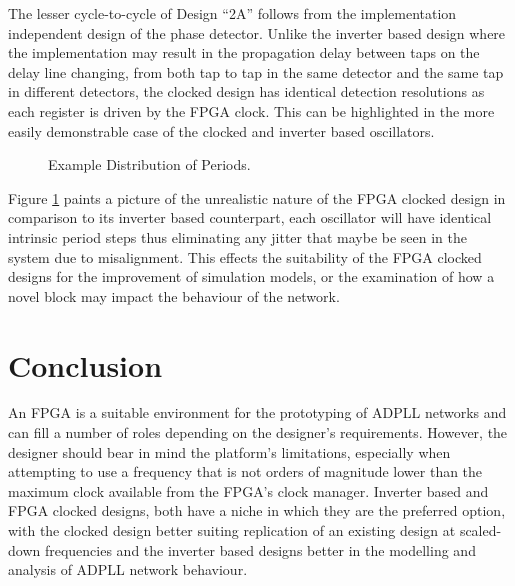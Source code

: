 \documentclass[conference]{IEEEtran}
\begin{document}
The lesser cycle-to-cycle of Design ``2A'' follows from the implementation independent design of the phase detector. Unlike the inverter based design where the implementation may result in the propagation delay between taps on the delay line changing, from both tap to tap in the same detector and the same tap in different detectors, the clocked design has identical detection resolutions as each register is driven by the FPGA clock. This can be highlighted in the more easily demonstrable case of the clocked and inverter based oscillators.\\
\begin{figure}[h]%
    \centering
    \caption{Example Distribution of Periods.\label{fig:dists}}    
    \vspace{-0.5cm}
\end{figure}
Figure \ref{fig:dists} paints a picture of the unrealistic nature of the FPGA clocked design in comparison to its inverter based counterpart, each oscillator will have identical intrinsic period steps thus eliminating any jitter that maybe be seen in the system due to misalignment. This effects the suitability of the FPGA clocked designs for the improvement of simulation models, or the examination of how a novel block may impact the behaviour of the network.
\section*{Conclusion}
An FPGA is a suitable environment for the prototyping of ADPLL networks and can fill a number of roles depending on the designer's requirements. However, the designer should bear in mind the platform's limitations, especially when attempting to use a frequency that is not orders of magnitude lower than the maximum clock available from the FPGA's clock manager. Inverter based and FPGA clocked designs, both have a niche in which they are the preferred option, with the clocked design better suiting replication of an existing design at scaled-down frequencies and the inverter based designs better in the modelling and analysis of ADPLL network behaviour.


 
\end{document}
